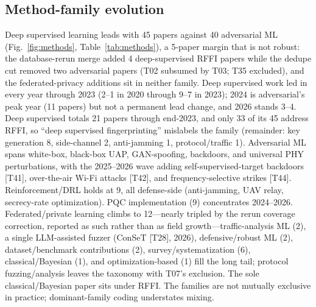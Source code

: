 \subsection{Method-family evolution}
Deep supervised learning leads with 45 papers against 40 adversarial ML (Fig.~\ref{fig:methods}, Table~\ref{tab:methods}), a 5-paper margin that is not robust: the database-rerun merge added 4 deep-supervised RFFI papers while the dedupe cut removed two adversarial papers (T02 subsumed by T03; T35 excluded), and the federated-privacy additions sit in neither family. Deep supervised work led in every year through 2023 (2--1 in 2020 through 9--7 in 2023); 2024 is adversarial's peak year (11 papers) but not a permanent lead change, and 2026 stands 3--4. Deep supervised totals 21 papers through end-2023, and only 33 of its 45 address RFFI, so ``deep supervised fingerprinting'' mislabels the family (remainder: key generation 8, side-channel 2, anti-jamming 1, protocol/traffic 1). Adversarial ML spans white-box, black-box UAP, GAN-spoofing, backdoors, and universal PHY perturbations, with the 2025--2026 wave adding self-supervised-target backdoors [T41], over-the-air Wi-Fi attacks [T42], and frequency-selective strikes [T44]. Reinforcement/DRL holds at 9, all defense-side (anti-jamming, UAV relay, secrecy-rate optimization). PQC implementation (9) concentrates 2024--2026. Federated/private learning climbs to 12---nearly tripled by the rerun coverage correction, reported as such rather than as field growth---traffic-analysis ML (2), a single LLM-assisted fuzzer (ConSeT [T28], 2026), defensive/robust ML (2), dataset/benchmark contributions (2), survey/systematization (6), classical/Bayesian (1), and optimization-based (1) fill the long tail; protocol fuzzing/analysis leaves the taxonomy with T07's exclusion. The sole classical/Bayesian paper sits under RFFI. The families are not mutually exclusive in practice; dominant-family coding understates mixing.

